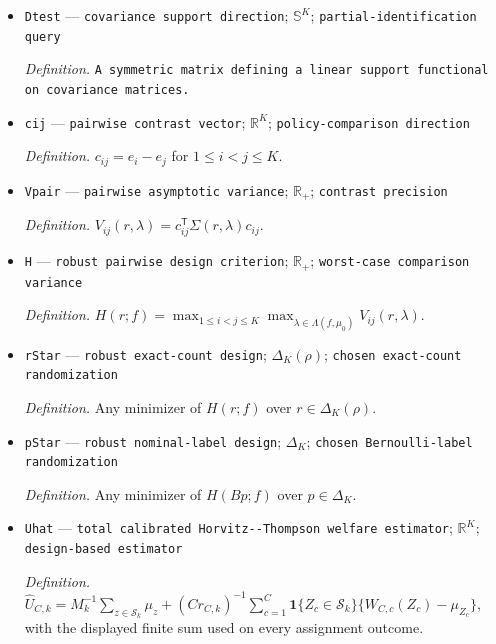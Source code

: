 \documentclass{article}
\begin{document}
\begin{itemize}
  \par\smallskip\noindent\emph{Definition.} \(\Sigma(r,\lambda)=\operatorname{diag}\{A_k(\lambda)/r_k:k=1,\ldots,K\}-\Xi(\lambda)\).
  \item \texttt{Dtest} --- \texttt{covariance support direction}; \(\mathbb S^K\); \texttt{partial-\allowbreak{}identification query}
  \par\smallskip\noindent\emph{Definition.} \texttt{A symmetric matrix defining a linear support functional on covariance matrices.}
  \item \texttt{cij} --- \texttt{pairwise contrast vector}; \(\mathbb R^K\); \texttt{policy-\allowbreak{}comparison direction}
  \par\smallskip\noindent\emph{Definition.} \(c_{ij}=e_i-e_j\) for \(1\le i<j\le K\).
  \item \texttt{Vpair} --- \texttt{pairwise asymptotic variance}; \(\mathbb R_+\); \texttt{contrast precision}
  \par\smallskip\noindent\emph{Definition.} \(V_{ij}(r,\lambda)=c_{ij}^{\mathsf T}\Sigma(r,\lambda)c_{ij}\).
  \item \texttt{H} --- \texttt{robust pairwise design criterion}; \(\mathbb R_+\); \texttt{worst-\allowbreak{}case comparison variance}
  \par\smallskip\noindent\emph{Definition.} \(H(r;f)=\max_{1\le i<j\le K}\max_{\lambda\in\Lambda(f,\mu_0)}V_{ij}(r,\lambda)\).
  \item \texttt{rStar} --- \texttt{robust exact-\allowbreak{}count design}; \(\Delta_K(\rho)\); \texttt{chosen exact-\allowbreak{}count randomization}
  \par\smallskip\noindent\emph{Definition.} Any minimizer of \(H(r;f)\) over \(r\in\Delta_K(\rho)\).
  \item \texttt{pStar} --- \texttt{robust nominal-\allowbreak{}label design}; \(\Delta_K\); \texttt{chosen Bernoulli-\allowbreak{}label randomization}
  \par\smallskip\noindent\emph{Definition.} Any minimizer of \(H(Bp;f)\) over \(p\in\Delta_K\).
  \item \texttt{Uhat} --- \texttt{total calibrated Horvitz-\allowbreak{}-\allowbreak{}Thompson welfare estimator}; \(\mathbb R^K\); \texttt{design-\allowbreak{}based estimator}
  \par\smallskip\noindent\emph{Definition.} \(\widehat U_{C,k}=M_k^{-1}\sum_{z\in\mathcal S_k}\mu_z+(C r_{C,k})^{-1}\sum_{c=1}^{C}\mathbf 1\{Z_c\in\mathcal S_k\}\{W_{C,c}(Z_c)-\mu_{Z_c}\}\), with the displayed finite sum used on every assignment outcome.

\end{itemize}
\end{document}
